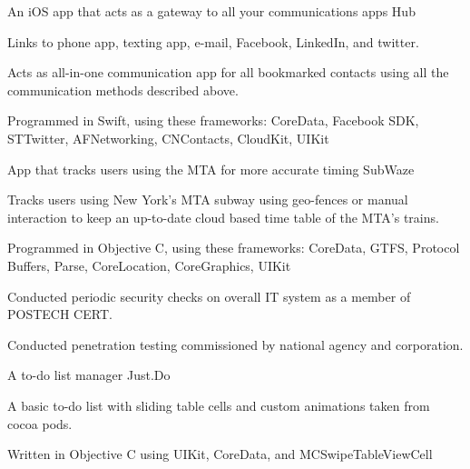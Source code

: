 

\begin{cventries}

  \cventry
    {An iOS app that acts as a gateway to all your communications apps}
    {Hub} %
    {} %
    {} %
    {
      \begin{cvitems}
        \item {Links to phone app, texting app, e-mail, Facebook, LinkedIn, and twitter.}
        \item {Acts as all-in-one communication app for all bookmarked contacts using all the communication methods described above.}
        \item {Programmed in Swift, using these frameworks: CoreData, Facebook SDK, STTwitter, AFNetworking, CNContacts, CloudKit, UIKit}
      \end{cvitems}
    }

  \cventry
    {App that tracks users using the MTA for more accurate timing}
    {SubWaze} %
    {} %
    {} %
    {
      \begin{cvitems} %
        \item {Tracks users using New York's MTA subway using geo-fences or manual interaction to keep an up-to-date cloud based time table of the MTA's trains.}
        \item {Programmed in Objective C, using these frameworks: CoreData, GTFS, Protocol Buffers, Parse, CoreLocation, CoreGraphics, UIKit}
        \item {Conducted periodic security checks on overall IT system as a member of POSTECH CERT.}
        \item {Conducted penetration testing commissioned by national agency and corporation.}
      \end{cvitems}
    }

    \cventry
      {A to-do list manager}
      {Just.Do}
      {}
      {}
      {
        \begin{cvitems}
          \item {A basic to-do list with sliding table cells and custom animations taken from cocoa pods.}
          \item {Written in Objective C using UIKit, CoreData, and MCSwipeTableViewCell}
          \end{cvitems}
      }


\end{cventries}
